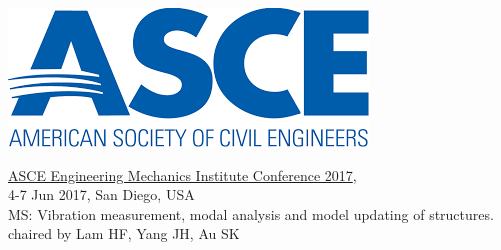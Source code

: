 \documentclass[11pt]{article}%
\begin{document}
\vspace{10pt}

\begin{minipage}[t]{0.15\textwidth}
\vspace{1pt}
\includegraphics[width=1\linewidth]{symposia/ascelogo.png}
\end{minipage}
\hspace{2pt}
\begin{minipage}[t]{0.79\textwidth}
\href{}{ASCE Engineering Mechanics Institute Conference 2017},\\ 
4-7 Jun 2017, San Diego, USA\\
MS: Vibration measurement, modal analysis and model updating of structures.\\
chaired by Lam HF, Yang JH, Au SK
\end{minipage}

\vspace{10pt}
\end{document}
